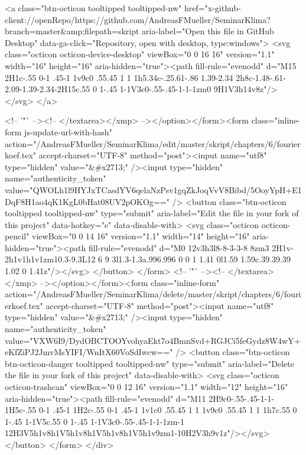         <a class="btn-octicon tooltipped tooltipped-nw"
           href="x-github-client://openRepo/https://github.com/AndreasFMueller/SeminarKlima?branch=master&amp;filepath=skript%
           aria-label="Open this file in GitHub Desktop"
           data-ga-click="Repository, open with desktop, type:windows">
            <svg class="octicon octicon-device-desktop" viewBox="0 0 16 16" version="1.1" width="16" height="16" aria-hidden="true"><path fill-rule="evenodd" d="M15 2H1c-.55 0-1 .45-1 1v9c0 .55.45 1 1 1h5.34c-.25.61-.86 1.39-2.34 2h8c-1.48-.61-2.09-1.39-2.34-2H15c.55 0 1-.45 1-1V3c0-.55-.45-1-1-1zm0 9H1V3h14v8z"/></svg>
        </a>

          <!-- '"` --><!-- </textarea></xmp> --></option></form><form class="inline-form js-update-url-with-hash" action="/AndreasFMueller/SeminarKlima/edit/master/skript/chapters/6/fourierkoef.tex" accept-charset="UTF-8" method="post"><input name="utf8" type="hidden" value="&#x2713;" /><input type="hidden" name="authenticity_token" value="QWOLh1l9HYJxTCasdYV6qelaNzPsv1gqZkJoqVvV8Bibd/5OoyYpH+E1DqF8H1ao4qK1KgL0bHat08UV2pOKOg==" />
            <button class="btn-octicon tooltipped tooltipped-nw" type="submit"
              aria-label="Edit the file in your fork of this project" data-hotkey="e" data-disable-with>
              <svg class="octicon octicon-pencil" viewBox="0 0 14 16" version="1.1" width="14" height="16" aria-hidden="true"><path fill-rule="evenodd" d="M0 12v3h3l8-8-3-3-8 8zm3 2H1v-2h1v1h1v1zm10.3-9.3L12 6 9 3l1.3-1.3a.996.996 0 0 1 1.41 0l1.59 1.59c.39.39.39 1.02 0 1.41z"/></svg>
            </button>
</form>
        <!-- '"` --><!-- </textarea></xmp> --></option></form><form class="inline-form" action="/AndreasFMueller/SeminarKlima/delete/master/skript/chapters/6/fourierkoef.tex" accept-charset="UTF-8" method="post"><input name="utf8" type="hidden" value="&#x2713;" /><input type="hidden" name="authenticity_token" value="VXW6I9/DydOBCTOOYvohyaEkt7o4BmnSvd+RGJCi5feGydz8W4wY+eKfZiPJ2JmvMsYIFI/WnItX60VoSdIwcw==" />
          <button class="btn-octicon btn-octicon-danger tooltipped tooltipped-nw" type="submit"
            aria-label="Delete the file in your fork of this project" data-disable-with>
            <svg class="octicon octicon-trashcan" viewBox="0 0 12 16" version="1.1" width="12" height="16" aria-hidden="true"><path fill-rule="evenodd" d="M11 2H9c0-.55-.45-1-1-1H5c-.55 0-1 .45-1 1H2c-.55 0-1 .45-1 1v1c0 .55.45 1 1 1v9c0 .55.45 1 1 1h7c.55 0 1-.45 1-1V5c.55 0 1-.45 1-1V3c0-.55-.45-1-1-1zm-1 12H3V5h1v8h1V5h1v8h1V5h1v8h1V5h1v9zm1-10H2V3h9v1z"/></svg>
          </button>
</form>  </div>

